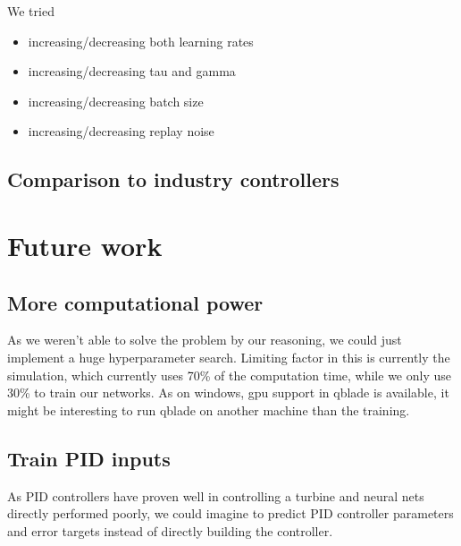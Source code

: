 \documentclass[hyperref,german,beleg]{cgvpub}
\begin{document}
We tried
\begin{itemize} 
  \item increasing/decreasing both learning rates
  \item increasing/decreasing tau and gamma
  \item increasing/decreasing batch size
  \item increasing/decreasing replay noise
\end{itemize}



\section{Comparison to industry controllers}




\chapter{Future work}

\section{More computational power}

As we weren't able to solve the problem by our reasoning, we could just implement a huge hyperparameter search. Limiting factor in this is currently the simulation, which currently uses 70\% of the computation time, while we only use 30\% to train our networks. As on windows, gpu support in qblade is available, it might be interesting to run qblade on another machine than the training.

\section{Train PID inputs}

As PID controllers have proven well in controlling a turbine and neural nets directly performed poorly, we could imagine to predict PID controller parameters and error targets instead of directly building the controller. 
\end{document}
